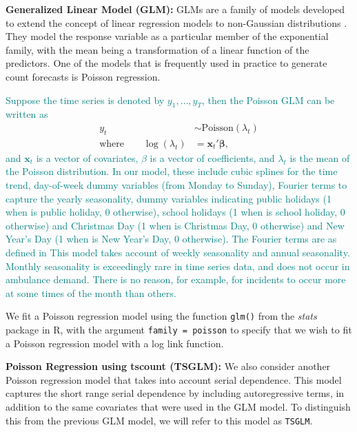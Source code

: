 \documentclass[
  authoryear,
  preprint,
  3p]{elsarticle}
\begin{document}
\textbf{Generalized Linear Model (GLM):} GLMs are a family of models
developed to extend the concept of linear regression models to
non-Gaussian distributions \citep{Faraway2016}. They model the response
variable as a particular member of the exponential family, with the mean
being a transformation of a linear function of the predictors. One of
the models that is frequently used in practice to generate count
forecasts is Poisson regression.

\textcolor{teal}{Suppose the time series is denoted by $y_1,\dots,y_T$, then the Poisson GLM can be written as}
\begin{align*}
  y_t &\sim \text{Poisson}(\lambda_t) \\
  \text{where}\qquad
  \log(\lambda_t) &= \bm{x}_t'\bm{\beta},
\end{align*}
\textcolor{teal}{and $\bm{x}_t$ is a vector of covariates, $\beta$ is a vector of coefficients, and $\lambda_t$ is the mean of the Poisson distribution. In our model, these include cubic splines for the time trend, day-of-week dummy variables (from Monday to Sunday), Fourier terms to capture the yearly seasonality, dummy variables indicating public holidays (1 when is public holiday, 0 otherwise), school holidays (1 when is school holiday, 0 otherwise) and Christmas Day (1 when is Christmas Day, 0 otherwise) and New Year's Day (1 when is New Year's Day, 0 otherwise). The Fourier terms are as defined in}
\citet[Section 7.4]{hyndman2021forecasting}
\textcolor{teal}{This model takes account of weekly seasonality and annual seasonality. Monthly seasonality is exceedingly rare in time series data, and does not occur in ambulance demand. There is no reason, for example, for incidents to occur more at some times of the month than others.}

We fit a Poisson regression model using the function \texttt{glm()} from
the \emph{stats} package in R, with the argument
\texttt{family\ =\ poisson} to specify that we wish to fit a Poisson
regression model with a log link function.

\textbf{Poisson Regression using tscount (TSGLM):} We also consider
another Poisson regression model that takes into account serial
dependence. This model captures the short range serial dependence by
including autoregressive terms, in addition to the same covariates that
were used in the GLM model. To distinguish this from the previous GLM
model, we will refer to this model as \texttt{TSGLM}.
\end{document}
